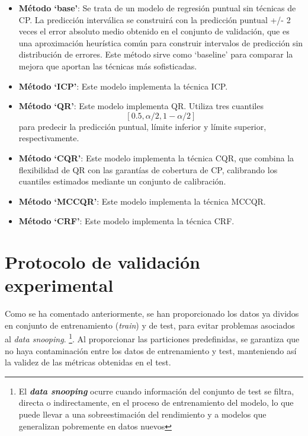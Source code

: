\begin{itemize}
    \item \textbf{Método `base'}: Se trata de un modelo de regresión puntual sin técnicas de CP. La predicción 
    interválica se construirá con la predicción puntual +/- 2 veces el error absoluto medio obtenido en el
    conjunto de validación, que es una aproximación heurística común para construir intervalos de predicción 
    sin distribución de errores.
    Este método sirve como `baseline' para comparar la mejora que aportan las técnicas más sofisticadas.

    \item \textbf{Método `ICP'}: Este modelo implementa la técnica ICP.
    
    \item \textbf{Método `QR'}: Este modelo implementa QR. Utiliza tres cuantiles 
    $$
    [0.5, \alpha/2, 1-\alpha/2]
    $$ 
    para predecir la predicción puntual, límite inferior y límite superior, respectivamente.

    \item \textbf{Método `CQR'}: Este modelo implementa la técnica CQR, que combina la flexibilidad de QR con las 
    garantías de cobertura de CP, calibrando los cuantiles estimados mediante un conjunto de calibración.

    \item \textbf{Método `MCCQR'}: Este modelo implementa la técnica MCCQR.
    
    \item \textbf{Método `CRF'}: Este modelo implementa la técnica CRF.
\end{itemize} 



\section{Protocolo de validación experimental}

Como se ha comentado anteriormente, se han proporcionado los datos ya dividos en conjunto de entrenamiento
(\textit{train}) y de test, para evitar problemas asociados al \textit{data snooping}. 
\footnote{
    El \textbf{\textit{data snooping}} ocurre cuando información del conjunto de test se filtra, directa 
    o indirectamente, en el proceso de entrenamiento del modelo, lo que puede llevar a una sobreestimación del 
    rendimiento y a modelos que generalizan pobremente en datos nuevos
}.
Al proporcionar las particiones predefinidas, se garantiza que no haya contaminación entre los datos de 
entrenamiento y test, manteniendo así la validez de las métricas obtenidas en el test. 

